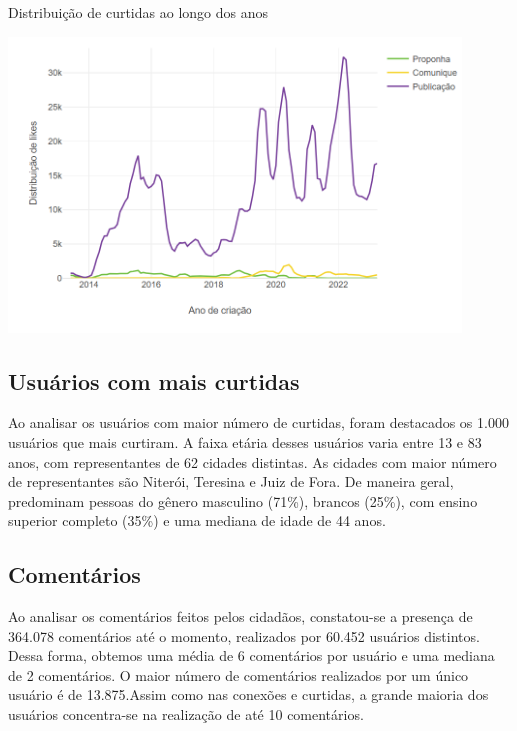 \begin{quadro}[!htb]
	\caption{Distribuição de curtidas ao longo dos anos}
	\label{fig:colab_likes_overtime}
	\centering
	\includegraphics[width=0.9\textwidth]{images/colab_likes_overtime.png}
\end{quadro}

\subsection*{Usuários com mais curtidas}

Ao analisar os usuários com maior número de curtidas, foram destacados os 1.000 usuários que mais curtiram. A faixa etária desses usuários varia entre 13 e 83 anos, com representantes de 62 cidades distintas. As cidades com maior número de representantes são Niterói, Teresina e Juiz de Fora. De maneira geral, predominam pessoas do gênero masculino (71\%), brancos (25\%), com ensino superior completo (35\%) e uma mediana de idade de 44 anos.

\subsection*{Comentários}

Ao analisar os comentários feitos pelos cidadãos, constatou-se a presença de 364.078 comentários até o momento, realizados por 60.452 usuários distintos. Dessa forma, obtemos uma média de 6 comentários por usuário e uma mediana de 2 comentários. O maior número de comentários realizados por um único usuário é de 13.875.Assim como nas conexões e curtidas, a grande maioria dos usuários concentra-se na realização de até 10 comentários.

